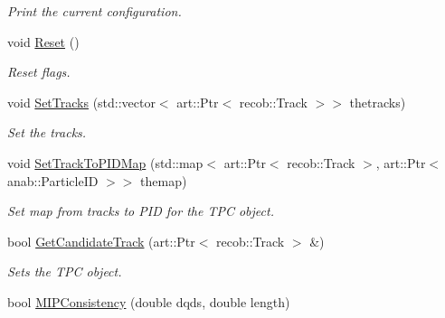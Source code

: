 \begin{DoxyCompactItemize}
\begin{DoxyCompactList}\small\item\em Print the current configuration. \end{DoxyCompactList}\item 
\hypertarget{classubana_1_1MuonCandidateFinder_a946f1adda03992caa715afaac8519a7d}{void \hyperlink{classubana_1_1MuonCandidateFinder_a946f1adda03992caa715afaac8519a7d}{Reset} ()}\label{classubana_1_1MuonCandidateFinder_a946f1adda03992caa715afaac8519a7d}

\begin{DoxyCompactList}\small\item\em Reset flags. \end{DoxyCompactList}\item 
\hypertarget{classubana_1_1MuonCandidateFinder_a1cdd1745117a85bbcfc1de5167c7e688}{void \hyperlink{classubana_1_1MuonCandidateFinder_a1cdd1745117a85bbcfc1de5167c7e688}{Set\-Tracks} (std\-::vector$<$ art\-::\-Ptr$<$ recob\-::\-Track $>$$>$ thetracks)}\label{classubana_1_1MuonCandidateFinder_a1cdd1745117a85bbcfc1de5167c7e688}

\begin{DoxyCompactList}\small\item\em Set the tracks. \end{DoxyCompactList}\item 
\hypertarget{classubana_1_1MuonCandidateFinder_adc3333300fec98b692ff12550c3d8d53}{void \hyperlink{classubana_1_1MuonCandidateFinder_adc3333300fec98b692ff12550c3d8d53}{Set\-Track\-To\-P\-I\-D\-Map} (std\-::map$<$ art\-::\-Ptr$<$ recob\-::\-Track $>$, art\-::\-Ptr$<$ anab\-::\-Particle\-I\-D $>$$>$ themap)}\label{classubana_1_1MuonCandidateFinder_adc3333300fec98b692ff12550c3d8d53}

\begin{DoxyCompactList}\small\item\em Set map from tracks to P\-I\-D for the T\-P\-C object. \end{DoxyCompactList}\item 
\hypertarget{classubana_1_1MuonCandidateFinder_a8f852194c03bf0b3c04650850271c7d9}{bool \hyperlink{classubana_1_1MuonCandidateFinder_a8f852194c03bf0b3c04650850271c7d9}{Get\-Candidate\-Track} (art\-::\-Ptr$<$ recob\-::\-Track $>$ \&)}\label{classubana_1_1MuonCandidateFinder_a8f852194c03bf0b3c04650850271c7d9}

\begin{DoxyCompactList}\small\item\em Sets the T\-P\-C object. \end{DoxyCompactList}\item 
\hypertarget{classubana_1_1MuonCandidateFinder_af622d542c3c3932572dc67588e75bcf6}{bool \hyperlink{classubana_1_1MuonCandidateFinder_af622d542c3c3932572dc67588e75bcf6}{M\-I\-P\-Consistency} (double dqds, double length)}\label{classubana_1_1MuonCandidateFinder_af622d542c3c3932572dc67588e75bcf6}


\end{DoxyCompactItemize}
